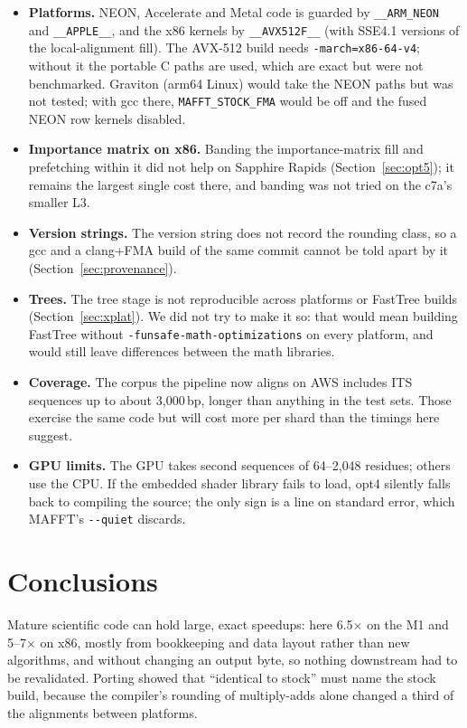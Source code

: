 \documentclass[11pt]{article}
\newcommand{\code}[1]{\texttt{#1}}
\begin{document}
\begin{itemize}
\item \textbf{Platforms.} NEON, Accelerate and Metal code is guarded by \code{\_\_ARM\_NEON}
  and \code{\_\_APPLE\_\_}, and the x86 kernels by \code{\_\_AVX512F\_\_} (with SSE4.1 versions of
  the local-alignment fill). The AVX-512 build needs \code{-march=x86-64-v4}; without it the
  portable C paths are used, which are exact but were not benchmarked. Graviton (arm64 Linux)
  would take the NEON paths but was not tested; with gcc there, \code{MAFFT\_STOCK\_FMA} would be
  off and the fused NEON row kernels disabled.
\item \textbf{Importance matrix on x86.} Banding the importance-matrix fill and prefetching
  within it did not help on Sapphire Rapids (Section~\ref{sec:opt5}); it remains the largest
  single cost there, and banding was not tried on the c7a's smaller L3.
\item \textbf{Version strings.} The version string does not record the rounding class, so a gcc
  and a clang+FMA build of the same commit cannot be told apart by it
  (Section~\ref{sec:provenance}).
\item \textbf{Trees.} The tree stage is not reproducible across platforms or FastTree builds
  (Section~\ref{sec:xplat}). We did not try to make it so: that would mean building FastTree
  without \code{-funsafe-math-\allowbreak optimizations} on every platform, and would still leave
  differences between the math libraries.
\item \textbf{Coverage.} The corpus the pipeline now aligns on AWS includes ITS sequences up to about
  3{,}000\,bp, longer than anything in the test sets. Those exercise the same code but will cost
  more per shard than the timings here suggest.
\item \textbf{GPU limits.} The GPU takes second sequences of 64--2{,}048 residues; others use
  the CPU. If the embedded shader library fails to load, opt4 silently falls back to
  compiling the source; the only sign is a line on standard error, which MAFFT's
  \code{-{}-quiet} discards.
\end{itemize}

\section{Conclusions}

Mature scientific code can hold large, exact speedups: here 6.5$\times$ on the M1 and
5--7$\times$ on x86, mostly from bookkeeping and data layout rather than new algorithms, and
without changing an output byte, so nothing downstream had to be revalidated. Porting showed
that ``identical to stock'' must name the stock build, because the compiler's rounding of
multiply-adds alone changed a third of the alignments between platforms.
\end{document}
